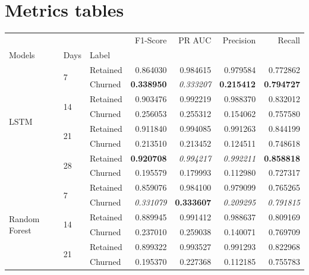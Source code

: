 \documentclass{kththesis}
\begin{document}

\section{Metrics tables}



\begin{table}
\centering
\begin{tabular}{lllrrrr}
\toprule
     &   &          &  F1-Score &    PR AUC &  Precision &    Recall \\
Models & Days & Label &           &           &            &           \\
\midrule
\multirow{8}{*}{LSTM} & \multirow{2}{*}{7} & Retained &  0.864030 &  0.984615 &   0.979584 &  0.772862 \\
     &   & Churned &  \textbf{0.338950} &  \textit{0.333207} &   \textbf{0.215412} &  \textbf{0.794727} \\
\cline{2-7}
     & \multirow{2}{*}{14} & Retained &  0.903476 &  0.992219 &   0.988370 &  0.832012 \\
     &   & Churned &  0.256053 &  0.255312 &   0.154062 &  0.757580 \\
\cline{2-7}
     & \multirow{2}{*}{21} & Retained &  0.911840 &  0.994085 &   0.991263 &  0.844199 \\
     &   & Churned &  0.213510 &  0.213452 &   0.124511 &  0.748618 \\
\cline{2-7}
     & \multirow{2}{*}{28} & Retained &  \textbf{0.920708} &  \textit{0.994217} &   \textit{0.992211} &  \textbf{0.858818} \\
     &   & Churned &  0.195579 &  0.179993 &   0.112980 &  0.727317 \\
\cline{1-7}
\cline{2-7}
\multirow{8}{*}{Random Forest} & \multirow{2}{*}{7} & Retained &  0.859076 &  0.984100 &   0.979099 &  0.765265 \\
     &   & Churned &  \textit{0.331079} &  \textbf{0.333607} &   \textit{0.209295} &  \textit{0.791815} \\
\cline{2-7}
     & \multirow{2}{*}{14} & Retained &  0.889945 &  0.991412 &   0.988637 &  0.809169 \\
     &   & Churned &  0.237010 &  0.259038 &   0.140071 &  0.769709 \\
\cline{2-7}
     & \multirow{2}{*}{21} & Retained &  0.899322 &  0.993527 &   0.991293 &  0.822968 \\
     &   & Churned &  0.195370 &  0.227368 &   0.112185 &  0.755783 \\

\end{tabular}
\end{table}
\end{document}
